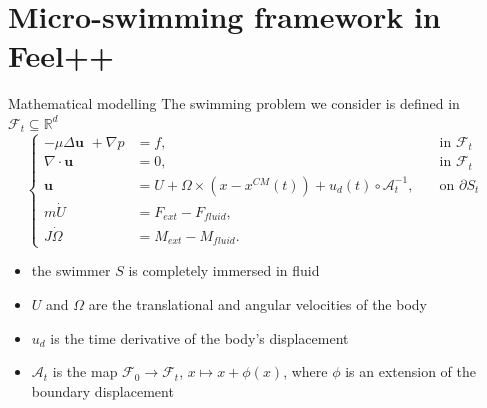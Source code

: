 \documentclass{beamer}
\begin{document}
	\section{Micro-swimming framework in Feel++}
	\begin{frame}{Mathematical modelling}
		The swimming problem we consider is defined in $\mathcal{F}_t \subseteq\mathbb{R}^d$
		\begin{equation*}
			\left\{
			\begin{aligned}
				-\mu \Delta \textbf{u }+ \nabla p &= f, \quad &\text{in  $\mathcal{F}_t$}\\
				\nabla \cdot \textbf{u} &= 0, \quad &\text{in  $\mathcal{F}_t$}\\
				\textbf{u} &= U+ \Omega \times (x-x^{CM}(t)) + u_d(t) \circ \mathcal{A}_t^{-1}, \quad &\text{on $\partial S_t$ }\\
				m \dot{U} &= F_{ext} -F_{fluid},\\
				J \dot{\Omega} &= M_{ext} -M_{fluid}.
			\end{aligned}
			\right.
			\label{Eq:FEM_Maury0}
		\end{equation*}
	\begin{itemize}
		\item the swimmer $S$ is completely immersed in fluid
		\item $U$ and $\Omega$ are the translational and angular velocities of the body
		\item $u_d$ is the time derivative of the body's displacement
		\item $\mathcal{A}_t$ is the map $\mathcal{F}_0 \to \mathcal{F}_t$, $x \mapsto x + \phi(x)$, where $\phi$ is an extension of the boundary displacement
	\end{itemize}
	\end{frame}
\end{document}
